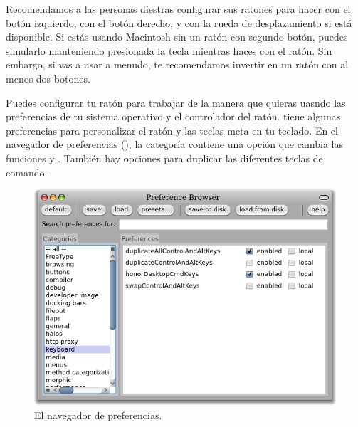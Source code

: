 \documentclass[a4paper,10pt,twoside]{book}
\begin{document}

Recomendamos a las personas diestras configurar sus ratones para hacer \click con el bot\'on izquierdo, \actclick con el bot\'on derecho, y \metaclick con la rueda de desplazamiento si est\'a disponible.
Si est\'as usando Macintosh sin un rat\'on con segundo bot\'on, puedes simularlo manteniendo presionada la tecla \clover{} mientras haces \click con el rat\'on. Sin embargo, si vas a usar \pharo a menudo, te recomendamos invertir en un rat\'on con al menos dos botones.

Puedes configurar tu rat\'on para trabajar de la manera que quieras uasndo las preferencias de tu sistema operativo y el controlador del rat\'on.
\pharo tiene algunas preferencias para personalizar el rat\'on y las teclas meta en tu teclado.
En el navegador de preferencias (), la categor\'ia  contiene una opci\'on  que cambia las funciones \actclick y \metaclick.
Tambi\'en hay opciones para duplicar las diferentes teclas de comando.

\begin{figure}[htb]
\centerline{\includegraphics[width=\textwidth]{PreferenceBrowser}}
\caption{El navegador de preferencias.}
\end{figure}
\end{document}
